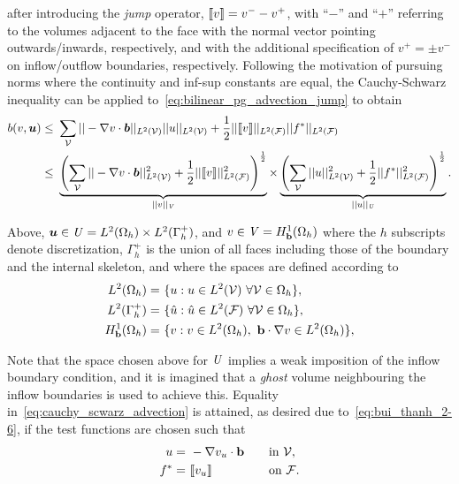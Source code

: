 after introducing the \textit{jump} operator, ${\llbracket v\rrbracket} = v^- - v^+ $, with ``$-$'' and ``$+$'' referring to the
volumes adjacent to the face with the normal vector pointing outwards/inwards, respectively, and with the additional
specification of $v^+ = \pm v^-$ on inflow/outflow boundaries, respectively. Following the motivation of pursuing norms
where the continuity and inf-sup constants are equal, the Cauchy-Schwarz inequality can be applied
to~\eqref{eq:bilinear_pg_advection_jump} to obtain
\begin{align} \label{eq:cauchy_scwarz_advection}
b(v,\varg{u})
\le\ & \sum_{\fe{V}}
|| - \nabla v \cdot \varv{b} ||_{L^2(\fe{V})} || u ||_{L^2(\fe{V})}
+
\frac{1}{2} ||\jump{v}||_{L^2(\fe{F})} ||f^*||_{L^2(\fe{F})} \\
\le\ &
\underbrace{\left(
\sum_{\fe{V}} || - \nabla v \cdot \varv{b} ||^2_{L^2(\fe{V})} + \frac{1}{2} ||\jump{v}||^2_{L^2(\fe{F})}
\right)^\frac{1}{2}}_{||v||_\fspace{V}}
\times
\underbrace{\left(
\sum_{\fe{V}} || u ||^2_{L^2(\fe{V})} + \frac{1}{2} ||f^*||^2_{L^2(\fe{F})}
\right)^\frac{1}{2}}_{||u||_\fspace{U}}.
\end{align}

Above, $\mathit{\bm{{u}}} \in \mathit{{{U}}} = L^2(\Omega_h) \times L^2(\Gamma^+_h)$, and $v \in \mathit{{{V}}} = H^1_{\mathbf{{b}}}(\Omega_h)$
where the $h$ subscripts denote discretization, $\Gamma^+_h$ is the union of all faces including those of the boundary
and the internal skeleton, and where the spaces are defined according to
\begin{align}
L^2(\Omega_h)
=\ & \{ u : u \in L^2(\fe{V})\ \forall \fe{V} \in \Omega_h \}, \\
L^2(\Gamma^+_h)
=\ & \{ \hat{u} : \hat{u} \in L^2(\fe{F})\ \forall \fe{V} \in \Omega_h \}, \\
H^1_{\vect{b}}(\Omega_h)
=\ & \{ v : v \in L^2(\Omega_h),\ \vect{b} \cdot \nabla v \in L^2(\Omega_h) \},
\end{align}

Note that the space chosen above for $\mathit{{{U}}}$ implies a weak imposition of the inflow boundary condition, and it is
imagined that a \textit{ghost} volume neighbouring the inflow boundaries is used to achieve this.
Equality in~\eqref{eq:cauchy_scwarz_advection} is attained, as desired due to~\eqref{eq:bui_thanh_2-6}, if
the test functions are chosen such that
\begin{alignat}{3}
u =\ & -\nabla v_u \cdot \vect{b}\quad && \text{in}\ \fe{V}, \\
f^* =\ & \jump{v_u} && \text{on}\ \fe{F}.
\end{alignat}

